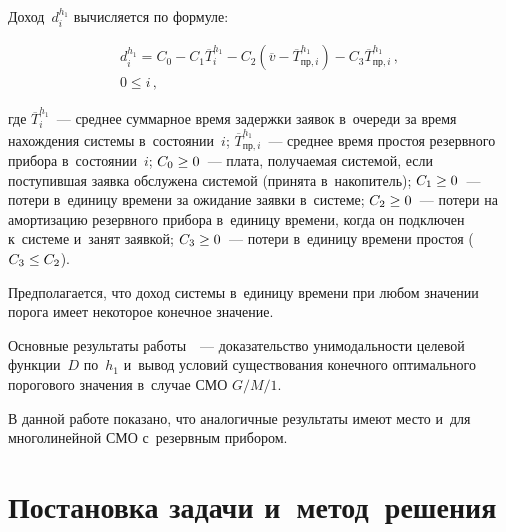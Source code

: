 \begin{multicols}{2}
 Доход~$d_i^{h_1}$ 
вы\-чис\-ля\-ет\-ся по формуле:

\vspace*{-8pt}

\noindent
\begin{multline}
d_i^{h_1} =C_0 -C_1 \overline{T}_i^{h_1} - C_2\left( \overline{v} -
\overline{T}^{h_1}_{\mathrm{пр},i} \right) -C_3 
\overline{T}^{h_1}_{\mathrm{пр},i}\,,\\
0\leq i\,,
\label{e2-al}
\end{multline}

\vspace*{-8pt}

\noindent
где $\overline{T}_i^{h_1}$~--- среднее суммарное время задержки заявок 
в~очереди за время нахождения сис\-те\-мы в~со\-сто\-янии~$i$; 
$\overline{T}^{h_1}_{\mathrm{пр},i}$~--- среднее время простоя резервного 
прибора в~со\-сто\-янии~$i$; $C_0\hm\geq 0$~--- плата, по\-лу\-ча\-емая сис\-те\-мой, если 
поступившая заявка обслужена сис\-те\-мой (принята в~накопитель); $C_1\hm\geq 
0$~--- потери в~единицу времени за ожидание заявки в~сис\-те\-ме; $C_2\hm\geq 
0$~---  потери на амортизацию резервного прибора в~единицу времени, когда он 
подключен к~сис\-те\-ме и~занят заявкой; $C_3\hm\geq 0$~--- потери в~единицу 
времени простоя ($C_3\hm\leq C_2$).
  
  Предполагается, что доход сис\-те\-мы в~единицу времени при любом значении 
порога имеет некоторое конечное значение.

\pagebreak
  
  Основные результаты работы~\cite{7-al}~--- доказательство уни\-мо\-даль\-ности 
целевой функции~$D$ по~$h_1$ и~вывод условий существования конечного 
оптимального порогового значения в~случае СМО $G/M/1$.
{ %

}

  
  В данной работе показано, что аналогичные результаты имеют место и~для 
многолинейной СМО с~резервным прибором.

  
\section{Постановка задачи и~метод~решения}



\end{multicols}
